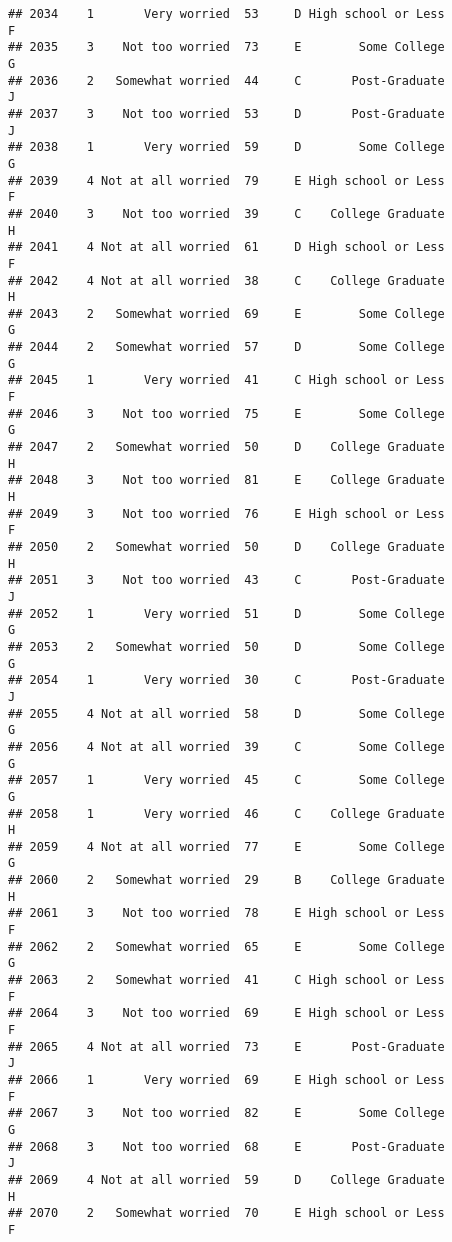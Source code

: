 \documentclass[
]{article}
\begin{document}
\begin{verbatim}
## 2034    1       Very worried  53     D High school or Less         F
## 2035    3    Not too worried  73     E        Some College         G
## 2036    2   Somewhat worried  44     C       Post-Graduate         J
## 2037    3    Not too worried  53     D       Post-Graduate         J
## 2038    1       Very worried  59     D        Some College         G
## 2039    4 Not at all worried  79     E High school or Less         F
## 2040    3    Not too worried  39     C    College Graduate         H
## 2041    4 Not at all worried  61     D High school or Less         F
## 2042    4 Not at all worried  38     C    College Graduate         H
## 2043    2   Somewhat worried  69     E        Some College         G
## 2044    2   Somewhat worried  57     D        Some College         G
## 2045    1       Very worried  41     C High school or Less         F
## 2046    3    Not too worried  75     E        Some College         G
## 2047    2   Somewhat worried  50     D    College Graduate         H
## 2048    3    Not too worried  81     E    College Graduate         H
## 2049    3    Not too worried  76     E High school or Less         F
## 2050    2   Somewhat worried  50     D    College Graduate         H
## 2051    3    Not too worried  43     C       Post-Graduate         J
## 2052    1       Very worried  51     D        Some College         G
## 2053    2   Somewhat worried  50     D        Some College         G
## 2054    1       Very worried  30     C       Post-Graduate         J
## 2055    4 Not at all worried  58     D        Some College         G
## 2056    4 Not at all worried  39     C        Some College         G
## 2057    1       Very worried  45     C        Some College         G
## 2058    1       Very worried  46     C    College Graduate         H
## 2059    4 Not at all worried  77     E        Some College         G
## 2060    2   Somewhat worried  29     B    College Graduate         H
## 2061    3    Not too worried  78     E High school or Less         F
## 2062    2   Somewhat worried  65     E        Some College         G
## 2063    2   Somewhat worried  41     C High school or Less         F
## 2064    3    Not too worried  69     E High school or Less         F
## 2065    4 Not at all worried  73     E       Post-Graduate         J
## 2066    1       Very worried  69     E High school or Less         F
## 2067    3    Not too worried  82     E        Some College         G
## 2068    3    Not too worried  68     E       Post-Graduate         J
## 2069    4 Not at all worried  59     D    College Graduate         H
## 2070    2   Somewhat worried  70     E High school or Less         F

\end{verbatim}
\end{document}
